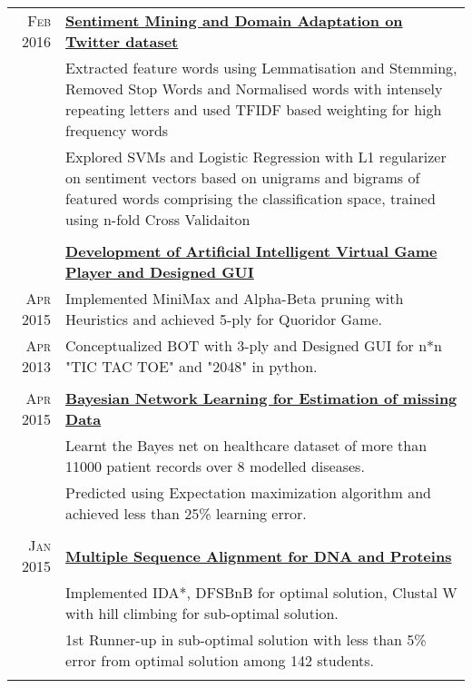 \documentclass[a4paper,10pt]{article}
\begin{document}
\begin{longtable}{r|p{16cm}}
\textsc{Feb 2016} & \textbf{\href{https://github.com/kautsiitd/Sentiment-Mining}{Sentiment Mining and Domain Adaptation on Twitter dataset}} \\
& Extracted feature words using Lemmatisation and Stemming, Removed Stop Words and Normalised words with intensely repeating letters and used TFIDF based weighting for high frequency words\\
& Explored SVMs and Logistic Regression with L1 regularizer on sentiment vectors based on unigrams and bigrams of featured words comprising the classification space, trained  using n-fold Cross Validaiton\\\multicolumn{2}{c}{}\\

& \textbf{\href{https://github.com/kautsiitd/Games-and-BOTS}{Development of Artificial Intelligent Virtual Game Player and Designed GUI}} \\
\textsc{Apr 2015} & Implemented MiniMax and Alpha-Beta pruning with Heuristics and achieved 5-ply for Quoridor Game.\\
\textsc{Apr 2013} & Conceptualized BOT with 3-ply and Designed GUI for n*n "TIC TAC TOE" and "2048" in python.\\\multicolumn{2}{c}{}\\

\textsc{Apr 2015} & \textbf{\href{https://github.com/kautsiitd/Data-Estimation-using-Bayesian-Network}{Bayesian Network Learning for Estimation of missing Data}} \\
& Learnt the Bayes net on healthcare dataset of more than 11000 patient records over 8 modelled diseases.\\
& Predicted using Expectation maximization algorithm and achieved less than 25\% learning error.\\\multicolumn{2}{c}{}\\

\textsc{Jan 2015} & \textbf{\href{https://github.com/kautsiitd/DNA-and-Proteins-Alignment}{Multiple Sequence Alignment for DNA and Proteins}} \\
& Implemented IDA*, DFSBnB for optimal solution, Clustal W with hill climbing for sub-optimal solution.\\
& 1st Runner-up in sub-optimal solution with less than 5\% error from optimal solution among 142 students.\\\multicolumn{2}{c}{}\\


\end{longtable}
\end{document}

